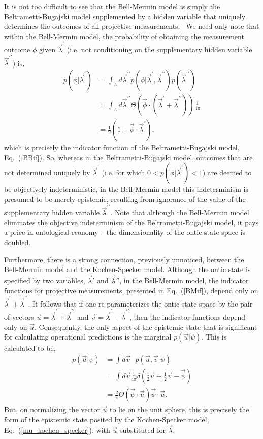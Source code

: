 \documentclass[aps,nofootinbib,12pt]{revtex4}
\begin{document}
It is not too difficult to see that the Bell-Mermin model is simply
the Beltrametti-Bugajski model supplemented by a hidden variable
that uniquely determines the outcomes of all projective
measurements. \ We need only note that within the Bell-Mermin model,
the probability of obtaining the measurement outcome $\phi$ given
$\vec{\lambda}^{\prime}$ (i.e. not conditioning on the supplementary
hidden variable $\vec{\lambda}^{\prime\prime }$) is,
\begin{align*}
p(\phi|\vec{\lambda}^{\prime})  &
=\int_{\Lambda}d\vec{\lambda}^{\prime\prime
}p(\phi|\vec{\lambda}^{\prime},\vec{\lambda}^{\prime\prime})p(\vec{\lambda
}^{\prime\prime})\\
& =\int_{\Lambda}d\vec{\lambda}^{\prime\prime}\Theta(\vec{\phi}\cdot
(\vec{\lambda}^{\prime}+\vec{\lambda}^{\prime\prime}))\frac{1}{4\pi}\\
& =\frac{1}{2}\left(  1+\vec{\phi}\cdot\vec{\lambda}^{\prime}\right)
,
\end{align*}
which is precisely the indicator function of the
Beltrametti-Bugajski model, Eq.~(\ref{BBif}). So, whereas in the
Beltrametti-Bugajski model, outcomes that are not determined
uniquely by $\vec{\lambda}^{\prime}$ (i.e. for which $0<p(\phi
|\vec{\lambda}^{\prime})<1$) are deemed to be objectively
indeterministic, in the Bell-Mermin model this indeterminism is
presumed to be merely epistemic, resulting from ignorance of the
value of the supplementary hidden variable $\vec{\lambda
}^{\prime\prime}.$ Note that although the Bell-Mermin model
eliminates the objective indeterminism of the Beltrametti-Bugajski
model, it pays a price in ontological economy -- the dimensionality
of the ontic state space is doubled.

Furthermore, there is a strong connection, previously unnoticed,
between the Bell-Mermin model and the Kochen-Specker model. Although
the ontic state is specified by two variables, $\vec{\lambda}'$ and
$\vec{\lambda}''$, in the Bell-Mermin model, the indicator functions
for projective measurements, presented in Eq.~(\ref{BMif}), depend
only on $\vec{\lambda}^{\prime}+\vec{\lambda }^{\prime\prime}$. It
follows that if one re-parameterizes the ontic state space by the
pair of vectors
$\vec{u}=\vec{\lambda}^{\prime}+\vec{\lambda}^{\prime\prime}$ and
$\vec{v}=\vec{\lambda}^{\prime}-\vec{\lambda}^{\prime\prime}$, then
the indicator functions depend only on $\vec{u}$. Consequently, the
only aspect of the epistemic state that is significant for
calculating operational predictions is the marginal
$p(\vec{u}|\psi)$. This is calculated to be,
\begin{align}
p(\vec{u}|\psi)  & =\int d\vec{v}\text{ }p(\vec{u},\vec{v}|\psi)\\
\nonumber & =\int
d\vec{v}\frac{1}{4\pi}\delta(\frac{1}{2}\vec{u}+\frac{1}{2}\vec
{v}-\vec{\psi})\\ \nonumber
&=\frac{2}{\pi}\Theta(\vec{\psi}\cdot\vec{u})\text{
}\vec{\psi}\cdot\vec{u}.
\end{align}
But, on normalizing the vector $\vec{u}$ to lie on the unit sphere,
this is precisely the form of the epistemic state posited by the
Kochen-Specker model, Eq.~(\ref{mu_kochen_specker}), with $\vec{u}$
substituted for $\vec{\lambda}$.
\end{document}
